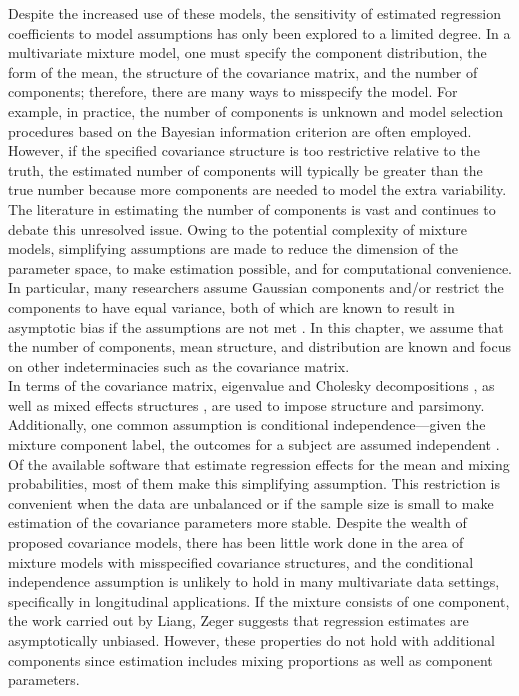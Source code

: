  Despite the increased use of these models, the sensitivity of estimated regression coefficients to model assumptions has only been explored to a limited degree. In a multivariate mixture model, one must specify the component distribution, the form of the mean, the structure of the covariance matrix, and the number of components; therefore, there are many ways to misspecify the model. For example, in practice, the number of components is unknown and model selection procedures based on the Bayesian information criterion are often employed. However, if the specified covariance structure is too restrictive relative to the truth, the estimated number of components will typically be greater than the true number because more components are needed to model the extra variability. The literature in estimating the number of components is  vast \cite{oliveira2005} and continues to debate this unresolved issue. Owing to the potential complexity of mixture models, simplifying assumptions are made to reduce the dimension of the parameter space, to make estimation possible, and for computational convenience. In particular, many researchers assume Gaussian components and/or restrict the components to have equal variance, both of which are known to result in asymptotic bias if the assumptions are not met \cite{gray1994, lo2011}. In this chapter, we assume that the number of components, mean structure, and distribution are known and focus on other indeterminacies such as the covariance matrix.\\
 
In terms of the covariance matrix, eigenvalue and Cholesky decompositions \cite{banfield1993,mcnicholas2010}, as well as mixed effects structures \cite{muthen1999}, are used to impose structure and parsimony. Additionally, one common assumption is conditional independence---given the mixture component label, the outcomes for a subject are assumed independent \cite{ostbye2011,muthen2008}. Of the available software that estimate regression effects for the mean and mixing probabilities, most of them make this simplifying assumption. This restriction is convenient when the data are unbalanced or if the sample size is small to make estimation of the covariance parameters more stable. Despite the wealth of proposed covariance models, there has been little work done in the area of mixture models with misspecified covariance structures, and the conditional independence assumption is unlikely to hold in many multivariate data settings, specifically in longitudinal applications. If the mixture consists of one component, the work carried out by Liang, Zeger \cite{liang1986} suggests that regression estimates are asymptotically unbiased. However, these properties do not hold with additional components since estimation includes mixing proportions as well as component parameters. \\


